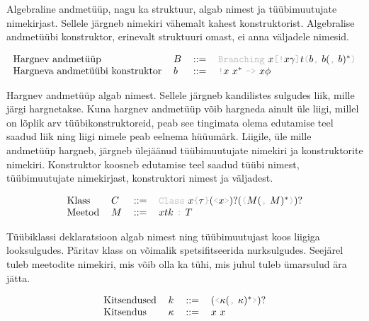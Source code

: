 \documentclass[12pt]{article}
\begin{document}
    Algebraline andmetüüp, nagu ka struktuur, algab nimest ja tüübimuutujate nimekirjast. Sellele järgneb nimekiri vähemalt kahest konstruktorist. Algebralise andmetüübi konstruktor, erinevalt struktuuri omast, ei anna väljadele nimesid.

    \begin{equation*}
      \begin{tabular}{llll}
        Hargnev andmetüüp               & $B$ & $::=$ & {\color{helehall}\verb!Branching!} $x${\color{helehall}\verb"[!"}$x\gamma${\color{helehall}\verb!]!}$t${\color{helehall}\verb!(!}$b${\color{helehall}\verb!,!} $b(${\color{helehall}\verb!,!} $b)^*${\color{helehall}\verb!)!} \\
        Hargneva andmetüübi konstruktor & $b$ & $::=$ & {\color{helehall}\verb"!"}$x$ $x^*$ {\color{helehall}\verb!->!} $x\phi$
      \end{tabular}
    \end{equation*}

    Hargnev andmetüüp algab nimest. Sellele järgneb kandilistes sulgudes liik, mille järgi hargnetakse. Kuna hargnev andmetüüp võib hargneda ainult üle liigi, millel on lõplik arv tüübikonstruktoreid, peab see tingimata olema edutamise teel saadud liik ning liigi nimele peab eelnema hüüumärk. Liigile, üle mille andmetüüp hargneb, järgneb ülejäänud tüübimuutujate nimekiri ja konstruktorite nimekiri. Konstruktor koosneb edutamise teel saadud tüübi nimest, tüübimuutujate nimekirjast, konstruktori nimest ja väljadest.

    \begin{equation*}
      \begin{tabular}{llll}
        Klass  & $C$ & $::=$ & {\color{helehall}\verb!Class!} $x${\color{helehall}\verb!{!}$\tau${\color{helehall}\verb!}!}$(${\color{helehall}\verb!<!}$x${\color{helehall}\verb!>!}$)?(${\color{helehall}\verb!(!}$M(${\color{helehall}\verb!,!} $M)^*${\color{helehall}\verb!)!}$)?$ \\
        Meetod & $M$ & $::=$ & $xtk$ {\color{helehall}\verb!:!} $T$
      \end{tabular}
    \end{equation*}

    Tüübiklassi deklaratsioon algab nimest ning tüübimuutujast koos liigiga looksulgudes. Päritav klass on võimalik spetsifitseerida nurksulgudes. Seejärel tuleb meetodite nimekiri, mis võib olla ka tühi, mis juhul tuleb ümarsulud ära jätta.

    \begin{equation*}
      \begin{tabular}{llll}
        Kitsendused & $k$      & $::=$ & $(${\color{helehall}\verb!<!}$\kappa(${\color{helehall}\verb!,!} $\kappa)^*${\color{helehall}\verb!>!}$)?$ \\
        Kitsendus   & $\kappa$ & $::=$ & $x$ $x$
      \end{tabular}
    \end{equation*}
\end{document}
